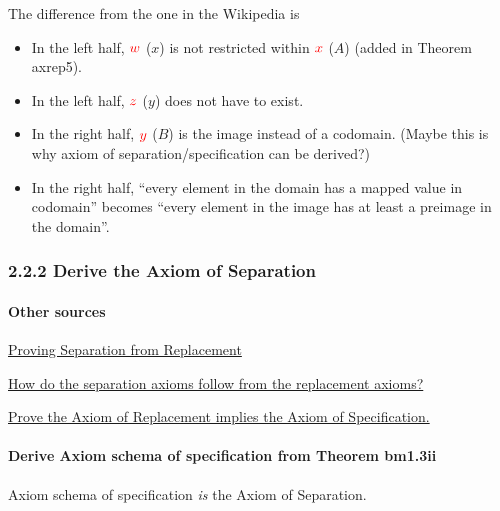 \documentclass[12pt, letterpaper]{article}
\newcommand{\red}[1]{{\color{red} #1}}
\newcommand{\provable}{\vdash}
\newcommand{\setvar}{\red}
\newcommand{\sw}{\setvar{w}}
\newcommand{\sx}{\setvar{x}}
\newcommand{\sy}{\setvar{y}}
\newcommand{\sz}{\setvar{z}}
\newenvironment{centabular}{\center\tabular}{\endtabular\endcenter}
\theoremstyle{definition}
\theoremstyle{remark}
\theoremstyle{definition}
\theoremstyle{plain}
\begin{document}
	The difference from the one in the Wikipedia
	is 
	\begin{itemize}
		\item In the left half, $\sw$ ($x$) is not restricted within $\sx$ ($A$) (added in Theorem axrep5).
		\item In the left half, $\sz$ ($y$) does not have to exist.
		\item In the right half, $\sy$ ($B$) is the image instead of a codomain. (Maybe this is why axiom of separation/specification can be derived?)
		\item In the right half, ``every element in the domain has a mapped value in codomain'' becomes
		``every element in the image has at least a preimage in the domain''.
	\end{itemize}
		
	\subsubsection*{2.2.2  Derive the Axiom of Separation}
	\paragraph{Other sources}
	\href{https://math.stackexchange.com/questions/680376/proving-separation-from-replacement}{Proving Separation from Replacement}
	
	\href{https://math.stackexchange.com/questions/32483/how-do-the-separation-axioms-follow-from-the-replacement-axioms}{How do the separation axioms follow from the replacement axioms?}
	
	\href{https://math.stackexchange.com/questions/1352431/prove-the-axiom-of-replacement-implies-the-axiom-of-specification?noredirect=1&lq=1}{Prove the Axiom of Replacement implies the Axiom of Specification.}
	
	\paragraph{Derive Axiom schema of specification from Theorem bm1.3ii}
	
	\red{Axiom schema of specification \textit{is} the Axiom of Separation.}
	
\end{document}
